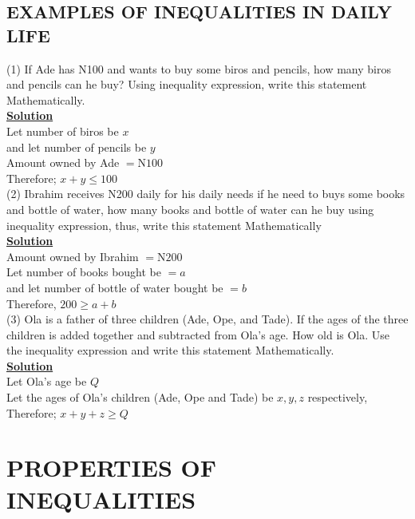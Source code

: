 \documentclass[12pt]{report}
\newcommand{\ubt}[1]{\textbf{\underline{#1}}}
\newcommand{\spn}[1]{\\[#1cm]}
\newcommand{\NI}{\noindent}
\begin{document}
	\section{EXAMPLES OF INEQUALITIES IN DAILY LIFE}
	\NI(1) If Ade has N100 and wants to buy some biros and pencils, how many biros and pencils can he buy? Using inequality expression, write this statement Mathematically.\spn{-.6}
		
	\NI\ubt{Solution}\\
	Let number of biros be $x$\\
	and let number of pencils be $y$\\
	Amount owned by Ade $= \text{N}100$\\
	Therefore; $x + y \leq 100$\\
		
	\NI(2) Ibrahim receives N200 daily for his daily needs if he need to buys some books and bottle of water, how many books and bottle of water can he buy using inequality expression, thus, write this statement Mathematically\spn{-.6}
		
	\NI\ubt{Solution}\\
	Amount owned by Ibrahim $=\text{N}200$\\
	Let number of books bought be $=a$\\
	and let number of bottle of water bought be $=b$\\
	Therefore, $200 \geq a+b$\\
		
	\NI(3) Ola is a father of three children (Ade, Ope, and Tade). If the ages of the three children is added together and subtracted from Ola's age. How old is Ola. Use the inequality expression and write this statement Mathematically.\spn{-.6}
		
	\NI\ubt{Solution}\\
	Let Ola's age be $Q$\\
	Let the ages of Ola's children (Ade, Ope and Tade) be $x, y, z$ respectively,\\
	Therefore; $x + y + z \geq Q$\\
	
	
	
	\chapter{PROPERTIES OF INEQUALITIES}
	
\end{document}
